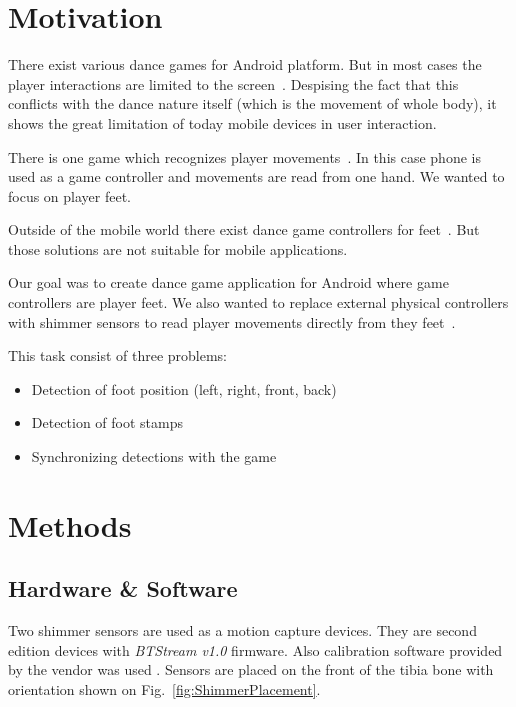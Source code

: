 \documentclass[conference]{IEEEtran}
\begin{document}
%
\IEEEpeerreviewmaketitle



\section{Motivation}

There exist various dance games for Android platform.
But in most cases the player interactions are limited to the screen~\cite{DanceGamesList}.
Despising the fact that this conflicts with the dance nature itself (which is the movement of whole body), it shows the great limitation of today mobile devices in user interaction.

There is one game which recognizes player movements~\cite{JustDanceNow}.
In this case phone is used as a game controller and movements are read from one hand.
We wanted to focus on player feet.

Outside of the mobile world there exist dance game controllers for feet~\cite{suzuki2001dance, openiano1992foot}. But those solutions are not suitable for mobile applications.

Our goal was to create dance game application for Android where game controllers are player feet.
We also wanted to replace external physical controllers with shimmer sensors to read player movements directly from they feet~\cite{Shimmer}.

This task consist of three problems:
\begin{itemize}
    \item Detection of foot position (left, right, front, back)
    \item Detection of foot stamps
    \item Synchronizing detections with the game
\end{itemize}


\section{Methods}

\subsection{Hardware \& Software}
Two shimmer sensors are used as a motion capture devices.
They are second edition devices with \emph{BTStream v1.0} firmware. Also calibration software provided by the vendor was used \cite{ShimmerCalibration}.
Sensors are placed on the front of the tibia bone with orientation shown on Fig.~\ref{fig:ShimmerPlacement}.
\end{document}
